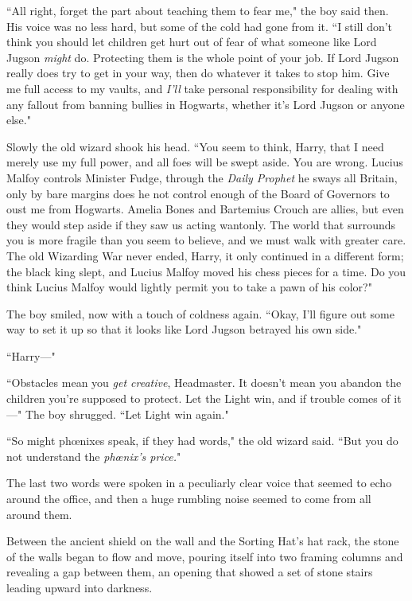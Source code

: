 ``All right, forget the part about teaching them to fear me," the boy said then. His voice was no less hard, but some of the cold had gone from it. ``I still don't think you should let children get hurt out of fear of what someone like Lord Jugson \emph{might} do. Protecting them is the whole point of your job. If Lord Jugson really does try to get in your way, then do whatever it takes to stop him. Give me full access to my vaults, and \emph{I'll} take personal responsibility for dealing with any fallout from banning bullies in Hogwarts, whether it's Lord Jugson or anyone else."

Slowly the old wizard shook his head. ``You seem to think, Harry, that I need merely use my full power, and all foes will be swept aside. You are wrong. Lucius Malfoy controls Minister Fudge, through the \emph{Daily Prophet} he sways all Britain, only by bare margins does he not control enough of the Board of Governors to oust me from Hogwarts. Amelia Bones and Bartemius Crouch are allies, but even they would step aside if they saw us acting wantonly. The world that surrounds you is more fragile than you seem to believe, and we must walk with greater care. The old Wizarding War never ended, Harry, it only continued in a different form; the black king slept, and Lucius Malfoy moved his chess pieces for a time. Do you think Lucius Malfoy would lightly permit you to take a pawn of his color?"

The boy smiled, now with a touch of coldness again. ``Okay, I'll figure out some way to set it up so that it looks like Lord Jugson betrayed his own side."

``Harry—"

``Obstacles mean you \emph{get creative}, Headmaster. It doesn't mean you abandon the children you're supposed to protect. Let the Light win, and if trouble comes of it—" The boy shrugged. ``Let Light win again."

``So might phœnixes speak, if they had words," the old wizard said. ``But you do not understand the \emph{phœnix's price.}"

The last two words were spoken in a peculiarly clear voice that seemed to echo around the office, and then a huge rumbling noise seemed to come from all around them.

Between the ancient shield on the wall and the Sorting Hat's hat rack, the stone of the walls began to flow and move, pouring itself into two framing columns and revealing a gap between them, an opening that showed a set of stone stairs leading upward into darkness.

